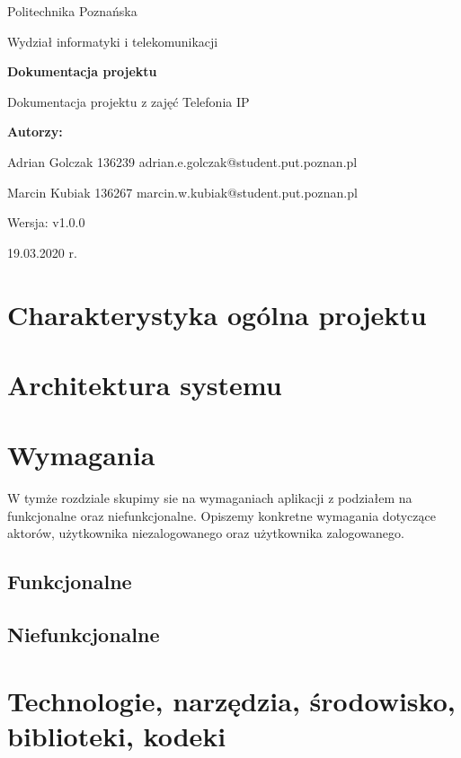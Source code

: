 \documentclass{article}
\newcommand{\version}{v1.0.0}
\begin{document}
\begin{titlepage}
		\begin{center}
			
						\LARGE
			Politechnika Poznańska
			
			\vspace{0.3cm}
			
			\large
			Wydział informatyki i telekomunikacji
			
			\vspace{3.0cm}
			\huge
			\textbf{Dokumentacja projektu}
			
			\vspace{0.5cm}
			
			\large
			Dokumentacja projektu z zajęć Telefonia IP
			
			\vspace{2.4cm}
			
			\LARGE
			\textbf{Autorzy:}
			
			\vspace{0.3cm}
			
			Adrian Golczak 136239
			adrian.e.golczak@student.put.poznan.pl
			
			\vspace{0.3cm}
			
			Marcin Kubiak 136267
			marcin.w.kubiak@student.put.poznan.pl
			
			\vfill
			
			\normalsize
			Wersja: \version
			
			\vspace{2cm}
			

			
			19.03.2020 r.
			
		\end{center}
\end{titlepage}
\tableofcontents
\newpage
\section{Charakterystyka ogólna projektu}

\newpage
\section{Architektura systemu}

\section{Wymagania}
W tymże rozdziale skupimy sie na wymaganiach aplikacji z podziałem na funkcjonalne oraz niefunkcjonalne. Opiszemy konkretne wymagania dotyczące aktorów, użytkownika niezalogowanego oraz użytkownika zalogowanego.
\subsection{Funkcjonalne}

\subsection{Niefunkcjonalne}

\section{Technologie, narzędzia, środowisko, biblioteki, kodeki}


\end{document}
